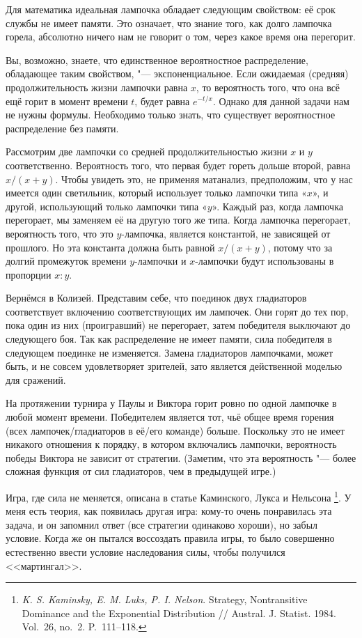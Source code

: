 \documentclass[twoside]{book}
\begin{document}
Для математика идеальная лампочка обладает следующим свойством: её
срок службы не имеет памяти.
Это означает, что знание того, как долго лампочка горела, абсолютно
ничего нам не говорит о том, через какое время она перегорит.

Вы, возможно, знаете, что единственное вероятностное распределение, обладающее таким свойством, "--- экспоненциальное.
Если ожидаемая (средняя) продолжительность жизни лампочки равна $x$, то вероятность того, что она всё ещё горит в момент времени $t$, будет равна $e^{-t/x}$.
Однако для данной задачи нам не нужны формулы.
Необходимо только знать, что существует вероятностное распределение без памяти.

Рассмотрим две лампочки со средней продолжительностью жизни $x$ и $y$ соответственно.
Вероятность того, что первая будет гореть дольше второй, равна $x/(x+y)$.
Чтобы увидеть это, не применяя матанализ, предположим, что у нас имеется один светильник, который использует только лампочки типа «$x$», и другой, использующий только лампочки типа «$y$».
Каждый раз, когда лампочка перегорает, мы заменяем её на другую того же типа.
Когда лампочка перегорает, вероятность того, что это $y$-лампочка, является константой, не зависящей от прошлого.
Но эта константа должна быть равной $x/(x+y)$, потому что за долгий промежуток времени $y$-лампочки и $x$-лампочки будут использованы в пропорции $x : y$.

Вернёмся в Колизей.
Представим себе, что поединок двух гладиаторов соответствует включению соответствующих им лампочек.
Они горят до тех пор, пока один из них (проигравший) не перегорает, затем победителя выключают до следующего боя.
Так как распределение не имеет памяти, сила победителя в следующем поединке не изменяется.
Замена гладиаторов лампочками, может быть, и не совсем удовлетворяет зрителей, зато является действенной моделью для сражений.

На протяжении турнира у Паулы и Виктора горит ровно по одной лампочке в любой момент времени.
Победителем является тот, чьё общее время горения (всех лампочек/гладиаторов в её/его команде) больше.
Поскольку это не имеет никакого отношения к порядку, в котором включались лампочки, вероятность победы Виктора не зависит от стратегии.
(Заметим, что эта вероятность "--- более сложная функция от сил гладиаторов, чем в предыдущей игре.)
\heart

\medskip

Игра, где сила не меняется, описана в статье Каминского, Лукса и Нельсона%
\footnote{\emph{K. S. Kaminsky, E. M. Luks, P. I. Nelson}. Strategy, Nontransitive Dominance and the Expo\-nen\-tial Distribution /\!/ {Austral. J. Statist.} 1984. Vol.~26, no.~2. P.~111--118.}.
У меня есть теория, как появилась другая игра: кому-то очень понравилась эта задача, и он запомнил ответ (все стратегии одинаково хороши), но забыл условие.
Когда же он пытался воссоздать правила игры, то было совершенно естественно ввести условие наследования силы, чтобы получился <<мартингал>>.
\end{document}
